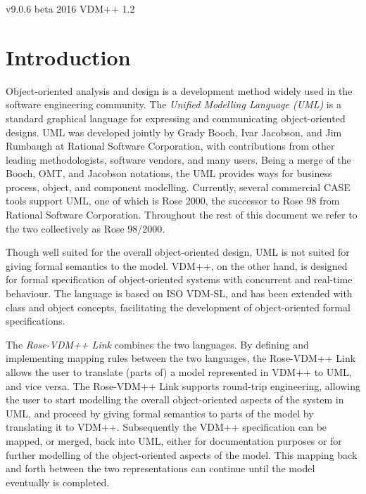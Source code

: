 \documentclass[\pformat,12pt]{article}
\newcommand{\vdmpp}{VDM++}
\newcommand{\link}{Rose-\vdmpp{} Link}
\newcommand{\rose}{Rose 98/2000}
\begin{document}
       {v9.0.6 beta}
       {2016}
       {VDM++}
       {1.2}




\section{Introduction}
\label{intro}

Object-oriented analysis and design is a development method widely
used in the software engineering community. The {\it Unified Modelling
  Language (UML)} is a standard graphical language for expressing and
communicating object-oriented designs. UML was developed jointly by
Grady Booch, Ivar Jacobson, and Jim Rumbaugh at Rational Software
Corporation, with contributions from other leading methodologists,
software vendors, and many users. Being a merge of the Booch, OMT, and
Jacobson notations, the UML provides ways for business process,
object, and component modelling. Currently, several commercial CASE
tools support UML, one of which is Rose 2000, the successor to Rose 98
from Rational Software Corporation. Throughout the rest of this
document we refer to the two collectively as \rose{}.

Though well suited for the overall object-oriented design, UML is not
suited for giving formal semantics to the model. \vdmpp{}, on the
other hand, is designed for formal specification of object-oriented
systems with concurrent and real-time behaviour. The language is based
on ISO VDM-SL, and has been extended with class and object concepts,
facilitating the development of object-oriented formal specifications.

The {\it \link{}} combines the two languages. By defining and
implementing mapping rules between the two languages, the \link{}
allows the user to translate (parts of) a model represented in
\vdmpp{} to UML, and vice versa. The \link{} supports round-trip
engineering, allowing the user to start modelling the overall
object-oriented aspects of the system in UML, and proceed by giving
formal semantics to parts of the model by translating it to
\vdmpp{}. Subsequently the \vdmpp{} specification can be mapped, or merged,
back into UML, either for documentation purposes or
for further modelling of the object-oriented aspects of the
model. This mapping back and forth between the two representations can
continue until the model eventually is completed.
\end{document}
